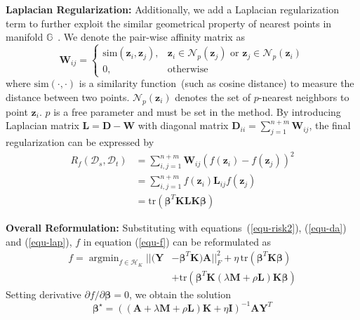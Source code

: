 \documentclass[sigconf]{acmart}
\begin{document}
\textbf{Laplacian Regularization: } 
Additionally, we add a Laplacian regularization term to further exploit the similar geometrical property of nearest points in manifold $\mathbb{G}$~\cite{belkin2006manifold}. We denote the pair-wise affinity matrix as
\begin{equation}
	\mathbf{W}_{ij} = \begin{cases}
		\mathrm{sim}(\mathbf{z}_i,\mathbf{z}_j), & \mathbf{z}_i \in \mathcal{N}_p(\mathbf{z}_j) \text{ or } \mathbf{z}_j \in \mathcal{N}_p(\mathbf{z}_i) \\
		0, & \text{otherwise}
	\end{cases}
\end{equation}
where $\mathrm{sim}(\cdot,\cdot)$ is a similarity function~(such as cosine distance) to measure the distance between two points. $\mathcal{N}_p(\mathbf{z}_i)$ denotes the set of $p$-nearest neighbors to point $\mathbf{z}_i$. $p$ is a free parameter and must be set in the method. By introducing Laplacian matrix $\mathbf{L}=\mathbf{D} - \mathbf{W}$ with diagonal matrix $\mathbf{D}_{ii}=\sum_{j=1}^{n+m} \mathbf{W}_{ij}$, the final regularization can be expressed by
\begin{equation}
	\label{equ-lap}
	\begin{split}
		R_f(\mathcal{D}_s,\mathcal{D}_t)&=\sum_{i,j=1}^{n+m} \mathbf{W}_{ij} (f(\mathbf{z}_i)-f(\mathbf{z}_j))^2\\
		&=\sum_{i,j=1}^{n+m} f(\mathbf{z}_i) \mathbf{L}_{ij} f(\mathbf{z}_j)\\
		&=\mathrm{tr} \left(\bm{\beta}^T \mathbf{K} \mathbf{L} \mathbf{K} \bm{\beta}\right)
	\end{split}
\end{equation}

\textbf{Overall Reformulation:} Substituting with equations~(\ref{equ-risk2}), (\ref{equ-da}) and (\ref{equ-lap}), $f$ in equation (\ref{equ-f}) can be reformulated as
\begin{equation}
	\label{equ-final}
	\begin{split}
		f=\mathop{\arg\min}_{f \in \mathcal{H}_{K}}||(\mathbf{Y} &- \bm{\beta}^T \mathbf{K}) \mathbf{A}||^2_{F} + \eta \, \mathrm{tr}(\bm{\beta}^T \mathbf{K} \bm{\beta})\\
		&+ \mathrm{tr}\left(\bm{\beta}^T \mathbf{K}(\lambda \mathbf{M} + \rho \mathbf{L}) \mathbf{K} \bm{\beta} \right)
	\end{split}
\end{equation}
Setting derivative $\partial f/ \partial \bm{\beta}=0$, we obtain the solution 
\begin{equation}
	\label{equ-solution}
	\bm{\beta}^\star= ((\mathbf{A} + \lambda \mathbf{M} + \rho \mathbf{L}) \mathbf{K} + \eta \mathbf{I})^{-1} \mathbf{A} \mathbf{Y}^T
\end{equation}
\end{document}

